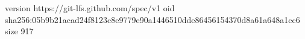 version https://git-lfs.github.com/spec/v1
oid sha256:05b9b21acad24f8123c8e9779e90a1446510dde86456154370d8a61a648a1cc6
size 917

